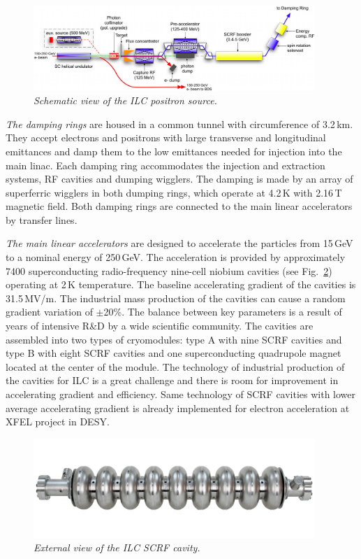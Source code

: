 \begin{figure}
{\centering
    \includegraphics[width=0.95\textwidth]{graphics/ILCeplus.jpg}
    \caption{\sl Schematic view of the ILC positron source.}
    \label{fig:ILCeplus}
  }
\end{figure}

\textit{The damping rings} are housed in a common tunnel with circumference of 3.2\,km. They accept electrons and positrons with large transverse and longitudinal emittances and damp them to the low emittances needed for injection into the main linac. 
Each damping ring accommodates the injection and extraction systems, RF cavities and dumping wigglers.
The damping is made by an array of superferric wigglers in both dumping rings, which operate at 4.2\,K with 2.16\,T magnetic field. 
Both damping rings are connected to the main linear accelerators by transfer lines.

\textit{The main linear accelerators} are designed to accelerate the particles from 15\,GeV to a nominal energy of 250\,GeV. 
The acceleration is provided by approximately 7400 superconducting radio-frequency nine-cell niobium cavities (see Fig.~\ref{fig:ILCcavity}) operating at 2\,K temperature. 
The baseline accelerating gradient of the cavities is 31.5\,MV/m. 
The industrial mass production of the cavities can cause a random gradient variation of $\pm$20\%. 
The balance between key parameters is a result of years of intensive R\&D by a wide scientific community. 
The cavities are assembled into two types of cryomodules: type A with nine SCRF cavities and type B with eight SCRF cavities and one superconducting quadrupole magnet located at the center of the module. 
The technology of industrial production of the cavities for ILC is a great challenge and there is room for improvement in accelerating gradient and efficiency. 
Same technology of SCRF cavities with lower average accelerating gradient is already implemented for electron acceleration at XFEL project in DESY. 
\begin{figure}
{\centering
    \includegraphics[width=0.95\textwidth]{graphics/Cavity.jpg}
    \caption{\sl External view of the ILC SCRF cavity.}
    \label{fig:ILCcavity}
  }
\end{figure}

